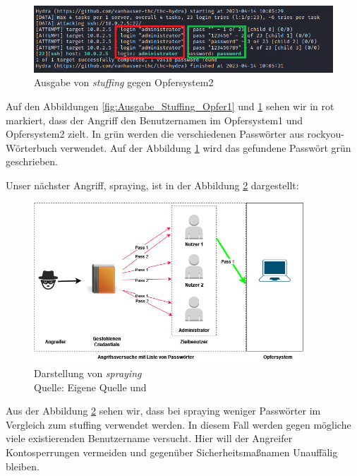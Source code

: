 \begin{figure}[H]
   \centering
   \includegraphics[width=1\textwidth]{assets/stuffing_kali2.png}
   \caption[Ausgabe von \textit{\gls{stuffing}} gegen Opfersystem2]
   {Ausgabe von \textit{\gls{stuffing}} gegen Opfersystem2}
   \label{fig:Ausgabe_Stuffing_Opfer2}
   \centering
\end{figure}

Auf den Abbildungen \ref{fig:Ausgabe_Stuffing_Opfer1} und \ref{fig:Ausgabe_Stuffing_Opfer2} sehen wir in rot markiert, dass der Angriff den Benutzernamen  im Opfersystem1 und  Opfersystem2 zielt. In grün werden die verschiedenen Passwörter aus \gls{rockyou}-Wörterbuch verwendet. Auf der Abbildung \ref{fig:Ausgabe_Stuffing_Opfer2} wird das gefundene Passwört grün geschrieben.

Unser nächster Angriff, \gls{spraying}, ist in der Abbildung \ref{fig:spraying} dargestellt:
\begin{figure}[H]
   \centering
   \includegraphics[width=0.9\textwidth]{assets/Spraying.jpg}
   \caption[Darstellung von \textit{\gls{spraying}}]
   {Darstellung von \textit{\gls{spraying}}\\Quelle: Eigene Quelle und \citep{Swathi_spraxy}}
   \label{fig:spraying}
   \centering
\end{figure}

Aus der Abbildung \ref{fig:spraying} sehen wir, dass bei \gls{spraying} weniger Passwörter im Vergleich zum \gls{stuffing} verwendet werden. In diesem Fall werden gegen mögliche viele existierenden Benutzername versucht. Hier will der Angreifer  Kontosperrungen vermeiden und gegenüber Sicherheitsmaßnamen Unauffälig bleiben.

